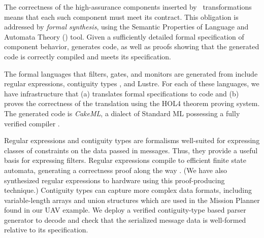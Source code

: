 The correctness of the high-assurance components inserted
by \briefcase \ transformations means that each such component
must meet its \agree{} contract. This obligation is addressed by
\emph{formal synthesis}, using the Semantic Properties of Language
and Automata Theory (\splat) tool.  Given a sufficiently detailed formal
specification of component behavior, \splat{} generates code,
as well as proofs showing that the generated code is
correctly compiled and meets its specification.

The formal languages that filters, gates, and monitors are generated
from include regular expressions, contiguity types
\cite{contiguity-types}, and Lustre.
For each of these languages, we have infrastructure
that (a) translates formal specifications to code and (b) proves the
correctness of the translation using the HOL4 theorem proving system.
The generated code is \emph{CakeML}, a dialect of Standard ML
possessing a fully verified compiler \cite{cakeml}.


Regular expressions and contiguity types are formalisms well-suited
for expressing classes of constraints on the data passed in
messages. Thus, they provide a useful basis for expressing
filters. Regular expressions compile to efficient finite state
automata, generating a correctness proof along the way
\cite{case-verified-filter}.  (We have also synthesized regular
expressions to hardware using this proof-producing
technique.)
Contiguity types can capture more complex
data formats, including variable-length arrays and union structures
which are used in the Mission Planner found in our UAV example.
We deploy a verified contiguity-type based parser generator
to decode and check that the serialized message data is well-formed
relative to its specification.

